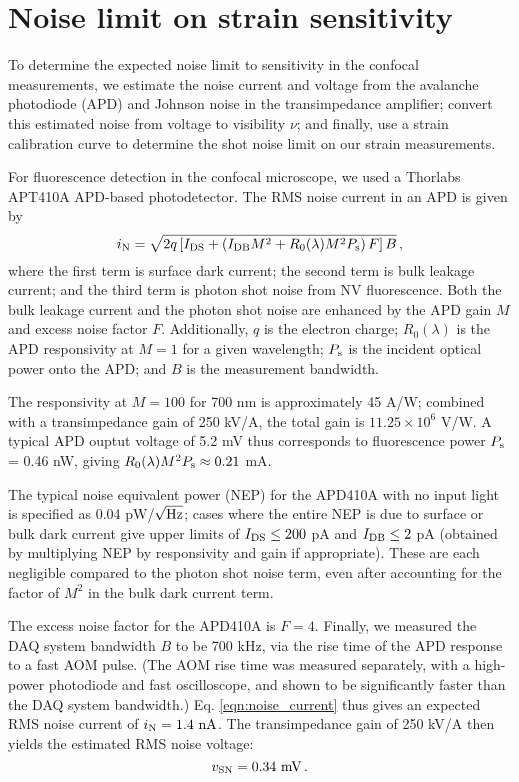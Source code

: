 \documentclass[reprint,superscriptaddress,hyphens,amsmath,amssymb,aps,prx,float]{revtex4-2}
\begin{document}
\section{Noise limit on strain sensitivity}
\label{sec:noiselimit}
To determine the expected noise limit to sensitivity in the confocal measurements, we estimate the noise current and voltage from the avalanche photodiode (APD) and Johnson noise in the transimpedance amplifier; convert this estimated noise from voltage to visibility $\nu$; and finally, use a strain calibration curve to determine the shot noise limit on our strain measurements.

For fluorescence detection in the confocal microscope, we used a Thorlabs APT410A APD-based photodetector.  The RMS noise current in an APD is given by
\begin{equation}
\label{eqn:noise_current}
    i_{\rm N} = \sqrt{2q\left[I_{\rm DS} + \left(I_{\rm DB} M^2 + R_0(\lambda)M^2 P_{\rm s}\right) F\right]B}\,, 
\end{equation}
where the first term is surface dark current; the second term is bulk leakage current; and the third term is photon shot noise from NV fluorescence.  Both the bulk leakage current and the photon shot noise are enhanced by the APD gain $M$ and excess noise factor $F$.  Additionally, $q$ is the electron charge; $R_0(\lambda)$ is the APD responsivity at $M=1$ for a given wavelength; $P_{\rm s}$ is the incident optical power onto the APD; and $B$ is the measurement bandwidth.

The responsivity at $M=100$ for 700 nm is approximately 45 A/W; combined with a transimpedance gain of 250 kV/A, the total gain is $11.25 \times 10^6$ V/W. A typical APD ouptut voltage of 5.2 mV thus corresponds to fluorescence power $P_{\rm s}$ = 0.46 nW, giving $R_0(\lambda)M^2 P_{\rm{s}} \approx 0.21$ mA. 

The typical noise equivalent power (NEP) for the APD410A with no input light is specified as 0.04 pW/$\sqrt{\rm{Hz}}$; cases where the entire NEP is due to surface or bulk dark current give upper limits of $I_{\rm{DS}} \leq 200$ pA and $I_{\rm{DB}}\leq 2$ pA (obtained by multiplying NEP by responsivity and gain if appropriate). These are each negligible compared to the photon shot noise term, even after accounting for the factor of $M^2$ in the bulk dark current term.



\smeight

The excess noise factor for the APD410A is $F=4$. Finally, we measured the DAQ system bandwidth $B$ to be 700 kHz, via the rise time of the APD response to a fast AOM pulse.  (The AOM rise time was measured separately, with a high-power photodiode and fast oscilloscope, and shown to be significantly faster than the DAQ system bandwidth.)  Eq. \eqref{eqn:noise_current} thus gives an expected RMS noise current of $i_{\rm N} = 1.4 ~{\rm nA}$. The transimpedance gain of 250 kV/A then yields the estimated RMS noise voltage:
\begin{equation}
\label{eqn:SN_noise}
    v_{\rm SN} = 0.34 ~{\rm mV}\,.
\end{equation}
\end{document}

